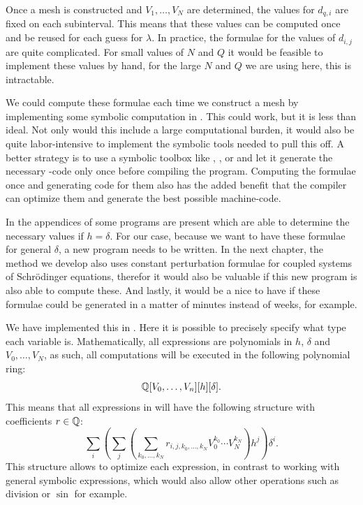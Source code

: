 Once a mesh is constructed and $V_1, \dots, V_{N}$ are determined, the values for $d_{q, i}$ are fixed on each subinterval. This means that these values can be computed once and be reused for each guess for $\lambda$. In practice, the formulae for the values of $d_{i, j}$ are quite complicated. For small values of $N$ and $Q$ it would be feasible to implement these values by hand, for the large $N$ and $Q$ we are using here, this is intractable.

We could compute these formulae each time we construct a mesh by implementing some symbolic computation in \cpp{}. This could work, but it is less than ideal. Not only would this include a large computational burden, it would also be quite labor-intensive to implement the symbolic tools needed to pull this off. A better strategy is to use a symbolic toolbox like \maple{}, \mathematica{}, or \sage{} and let it generate the necessary \cpp{}-code only once before compiling the program. Computing the formulae once and generating code for them  also has the added benefit that the \cpp{} compiler can optimize them and generate the best possible machine-code.

In the appendices of \cite{ledoux_study_2007} some \maple{} programs are present which are able to determine the necessary values if $h = \delta$. For our case, because we want to have these formulae for general $\delta$, a new program needs to be written. In the next chapter, the method we develop also uses constant perturbation formulae for coupled systems of Schrödinger equations, therefor it would also be valuable if this new program is also able to compute these. And lastly, it would be a nice to have if these formulae could be generated in a matter of minutes instead of weeks, for example.

We have implemented this in \sage{} \cite{sagemath}. Here it is possible to precisely specify what type each variable is. Mathematically, all expressions are polynomials in $h$, $\delta$ and $V_0, \dots, V_N$, as such, all computations will be executed in the following polynomial ring:
$$
    \mathbb{Q}[V_0, \dots, V_n][h][\delta]\text{.}
$$
This means that all expressions in \sage{} will have the following structure with coefficients $r \in \mathbb{Q}$:
$$
    \sum_i \left(\sum_j \left( \sum_{k_0,\dots, k_N} r_{i,j,k_0,\dots,k_N} V_0^{k_0} \cdots V_N^{k_N}  \right)h^j \right) \delta^i\text{.}
$$
This structure allows \sage{} to optimize each expression, in contrast to working with general symbolic expressions, which would also allow other operations such as division or $\sin$ for example.

